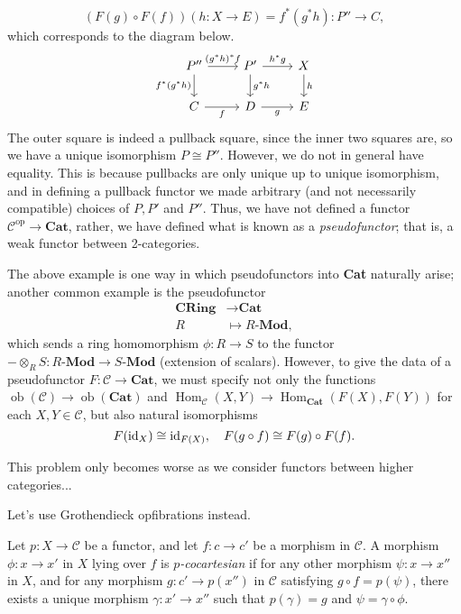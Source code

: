 \documentclass{MetricNotes2023}
\def\id{\ensuremath\text{id}}
\DeclareMathOperator{\Hom}{Hom}
\DeclareMathOperator{\ob}{ob}
\begin{document}
\[(F(g)\circ F(f))(h : X \to E)=f^*(g^*h) : P'' \to C,\] which corresponds to the diagram below.
\[\begin{tikzcd}
P'' \arrow[r, "(g^*h)^*f"] \arrow[d, swap, "f^*(g^*h)"]  & P' \arrow[r, "h^*g"] \arrow[d, "g^*h"] & X \arrow[d, "h"]  \\
C \arrow[r, swap, "f"]  & D \arrow[r, swap, "g"] & E
\end{tikzcd}\]
The outer square is indeed a pullback square, since the inner two squares are, so we have a unique isomorphism \(P \cong P''\). However, we do not in general have equality. This is because pullbacks are only unique up to unique isomorphism, and in defining a pullback functor we made arbitrary (and not necessarily compatible) choices of \(P, P'\) and \(P''\). Thus, we have not defined a functor \(\mathcal{C}^{\text{op}}\to \textbf{Cat}\), rather, we have defined what is known as a \textit{pseudofunctor}; that is, a weak functor between 2-categories. 

The above example is one way in which pseudofunctors into \textbf{Cat} naturally arise; another common example is the pseudofunctor
\begin{align*}
\textbf{CRing}&\to \textbf{Cat}\\
R\; &\mapsto R \textbf{-Mod},
\end{align*}
which sends a ring homomorphism \(\phi : R \to S\) to the functor \(-\otimes_R S : R \textbf{-Mod}\to S \textbf{-Mod}\) (extension of scalars). However, to give the data of a pseudofunctor \(F : \mathcal{C} \to \textbf{Cat}\), we must specify not only the functions \(\ob(\mathcal{C})\to \ob(\textbf{Cat})\) and \(\Hom_\mathcal{C}(X, Y)\to \Hom_\textbf{Cat}(F(X), F(Y))\) for each \(X, Y \in \mathcal{C}\), but also natural isomorphisms
\[F(\id_X) \cong \id_{F(X)}, \quad F(g \circ f) \cong F(g) \circ F(f).\]

This problem only becomes worse as we consider functors between higher categories...

Let's use Grothendieck opfibrations instead.

\begin{definition}
Let \(p : X \to \mathcal{C}\) be a functor, and let \(f : c \to c'\) be a morphism in \(\mathcal{C}\). A morphism \(\phi : x \to x'\) in \(X\) lying over \(f\) is \textit{\(p\)-cocartesian} if for any other morphism \(\psi : x \to x''\) in \(X\), and for any morphism \(g : c' \to p(x'')\) in \(\mathcal{C}\) satisfying \(g \circ f = p(\psi)\), there exists a unique morphism \(\gamma : x' \to x''\) such that \(p(\gamma)=g\) and \(\psi = \gamma \circ \phi\).  
\end{definition}
\end{document}
